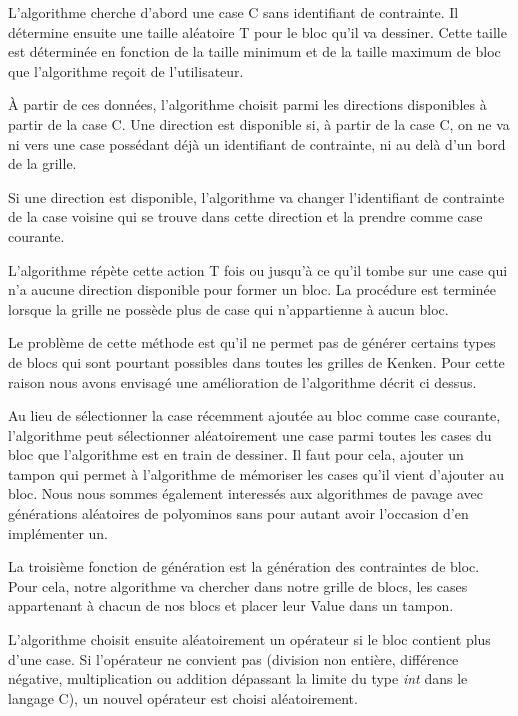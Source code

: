 \documentclass[1]{report}
\begin{document}
\begin{itemize}
            L'algorithme cherche d'abord une case C sans identifiant de contrainte. Il détermine ensuite une taille aléatoire T pour le bloc qu'il va dessiner. Cette taille est déterminée en fonction de la taille minimum et de la taille maximum de bloc que l'algorithme reçoit de l'utilisateur. \newline 
            
            À partir de ces données, l'algorithme choisit parmi les directions disponibles à partir de la
            case C. Une direction est disponible si, à partir de la case C, on ne va ni vers une case possédant déjà un identifiant de contrainte, ni au delà d'un bord de la grille. \newline 
            
            Si une direction est disponible, l'algorithme va changer l'identifiant de contrainte de la case voisine qui se trouve dans cette direction et la prendre comme case courante. \newline 
            
            L'algorithme répète cette action T fois ou jusqu'à ce qu'il tombe sur une case qui n'a aucune direction disponible pour former un bloc. La procédure est terminée lorsque la grille ne possède plus de case qui n'appartienne à aucun bloc. \newline
            
            Le problème de cette méthode est qu'il ne permet pas de générer certains types de blocs qui sont pourtant possibles dans toutes les grilles de Kenken. Pour cette raison nous avons envisagé une amélioration de l'algorithme décrit ci dessus. \newline
            
            Au lieu de sélectionner la case récemment ajoutée au bloc comme case courante, l'algorithme peut sélectionner aléatoirement une case parmi toutes les cases du bloc que l'algorithme est en train de dessiner. Il faut pour cela, ajouter un tampon qui permet à l'algorithme de mémoriser les cases qu'il vient d'ajouter au bloc. Nous nous sommes également interessés aux algorithmes de pavage avec générations aléatoires de polyominos sans pour autant avoir l'occasion d'en implémenter un. \newline

            La troisième fonction de génération est la génération des contraintes de bloc. Pour cela, notre algorithme va chercher dans notre grille de blocs,  les cases appartenant à chacun de nos blocs et placer leur Value dans un tampon. \newline
            
            L'algorithme choisit ensuite aléatoirement un opérateur si le bloc contient plus d'une case. Si l'opérateur ne convient pas (division non entière, différence négative, multiplication ou addition dépassant la limite du type \textit{int} dans le langage C), un nouvel opérateur est choisi aléatoirement. \newline


        \end{itemize}
\end{document}
